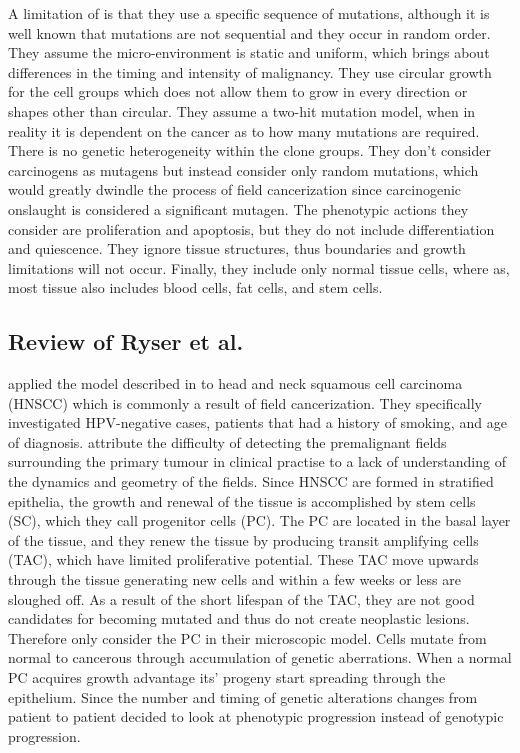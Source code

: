 \documentclass[\main/thesis.tex]{subfiles}
\begin{document}
A limitation of \textcite{Foo} is that they use a specific sequence of mutations, although it is well known that mutations are not sequential and they occur in random order. They assume the micro-environment is static and uniform, which brings about differences in the timing and intensity of malignancy. They use circular growth for the cell groups which does not allow them to grow in every direction or shapes other than circular. They assume a two-hit mutation model, when in reality it is dependent on the cancer as to how many mutations are required. There is no genetic heterogeneity within the clone groups. They don't consider carcinogens as mutagens but instead consider only random mutations, which would greatly dwindle the process of field cancerization since carcinogenic onslaught is considered a significant mutagen. The phenotypic actions they consider are proliferation and apoptosis, but they do not include differentiation and quiescence.  They ignore tissue structures, thus boundaries and growth limitations will not occur. Finally, they include only normal tissue cells, where as, most tissue also includes blood cells, fat cells, and stem cells. 

\subsection{Review of Ryser et al.}
\textcite{Ryser} applied the model described in \textcite{Foo} to head and neck squamous cell carcinoma (HNSCC) which is commonly a result of field cancerization. They specifically investigated HPV-negative cases, patients that had a history of smoking, and age of diagnosis. \textcite{Ryser} attribute the difficulty of detecting the premalignant fields surrounding the primary tumour in clinical practise to a lack of understanding of the dynamics and geometry of the fields. Since HNSCC are formed in stratified epithelia, the growth and renewal of the tissue is accomplished by stem cells (SC), which they call progenitor cells (PC). The PC are located in the basal layer of the tissue, and they renew the tissue by producing transit amplifying cells (TAC), which have limited proliferative potential. These TAC move upwards through the tissue generating new cells and within a few weeks or less are sloughed off. As a result of the short lifespan of the TAC, they are not good candidates for becoming mutated and thus do not create neoplastic lesions. Therefore \textcite{Ryser} only consider the PC in their microscopic model. Cells mutate from normal to cancerous through accumulation of genetic aberrations. When a normal PC acquires growth advantage its' progeny start spreading through the epithelium. Since the number and timing of genetic alterations changes from patient to patient \textcite{Ryser} decided to look at phenotypic progression instead of genotypic progression. 
\end{document}
